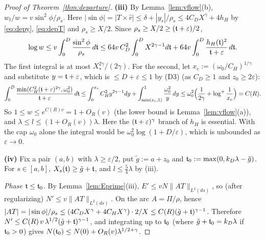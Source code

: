 \begin{proof}[Proof of Theorem~\ref{thm:departure}]
\textbf{(iii)} By Lemma~\ref{lem:vflow}(b), $w_t/w=v\sin^2\phi/\rho_s$. Here
$|\sin\phi|=|T\times\hat r|\le\delta+|y_s|/\rho_s\le4C_DX^\gamma+4h_H$ by \eqref{eq:depy}, \eqref{eq:depT} and
$\rho_s\ge X/2$. Since $\rho_s\ge X/2\ge(\mathfrak{t}+\varepsilon)/2$,
\[
\log w\le v\int_0^D\frac{\sin^2\phi}{\rho_s}\,d\mathfrak{t}\le64v\,C_D^2\int_0^DX^{2\gamma-1}d\mathfrak{t}+64v\int_0^D\frac{h_H(\mathfrak{t})^2}{\mathfrak{t}+\varepsilon}\,d\mathfrak{t} .
\]
The first integral is at most $X_*^{2\gamma}/(2\gamma)$. For the second, let $x_c:=(\omega_0/C_H)^{1/\gamma}$ and
substitute $y=\mathfrak{t}+\varepsilon$, which is $\le D+\varepsilon\le1$ by (D3) (as $C_D\ge1$ and $z_0\ge2\varepsilon$):
\begin{equation}\label{eq:hint}
\int_0^D\frac{\min(C_H^2(\mathfrak{t}+\varepsilon)^{2\gamma},\omega_0^2)}{\mathfrak{t}+\varepsilon}\,d\mathfrak{t}
\le\int_0^{x_c}C_H^2y^{2\gamma-1}dy+\int_{\min(x_c,1)}^1\frac{\omega_0^2}y\,dy
\le\omega_0^2\Bigl(\frac1{2\gamma}+\log^+\frac1{x_c}\Bigr)=C(R).
\end{equation}
So $1\le w\le e^{C(R)v}=1+O_R(v)$ (the lower bound is Lemma~\ref{lem:vflow}(a)), and $\lambda\le l\le(1+O_R(v))\lambda$.
Here the $(\mathfrak{t}+\varepsilon)^\gamma$ branch of $h_H$ is essential. With the cap $\omega_0$ alone the integral would be
$\omega_0^2\log(1+D/\varepsilon)$, which is unbounded as $\varepsilon\to0$.

\textbf{(iv)} Fix a pair $(a,b)$ with $\lambda\ge\varepsilon/2$, put $\tilde g:=a+z_0$ and
$\mathfrak{t}_0:=\max(0,k_D\lambda-\tilde g)$. For $s\in[a,b]$, $X_s(\mathfrak{t})\ge\tilde g+\mathfrak{t}$, and $l\le\frac54\lambda$ by (iii).

\emph{Phase $\mathfrak{t}\le\mathfrak{t}_0$.} By Lemma~\ref{lem:Eprime}(iii), $E'\le vN\|AT\|_{L^2(ds)}$, so (after regularizing)
$N'\le v\|AT\|_{L^2(ds)}$. On the arc $A=\Pi/\rho$, hence
$|AT|=|\sin\phi|/\rho_s\le(4C_DX^\gamma+4C_HX^\gamma)\cdot2/X\le C(R)(\tilde g+\mathfrak{t})^{\gamma-1}$. Therefore
$N'\le C(R)\,v\,\lambda^{1/2}(\tilde g+\mathfrak{t})^{\gamma-1}$, and integrating up to $\mathfrak{t}_0$ (where $\tilde g+\mathfrak{t}_0=k_D\lambda$
if $\mathfrak{t}_0>0$) gives $N(\mathfrak{t}_0)\le N(0)+O_R(v)\lambda^{1/2+\gamma}$.


\end{proof}

